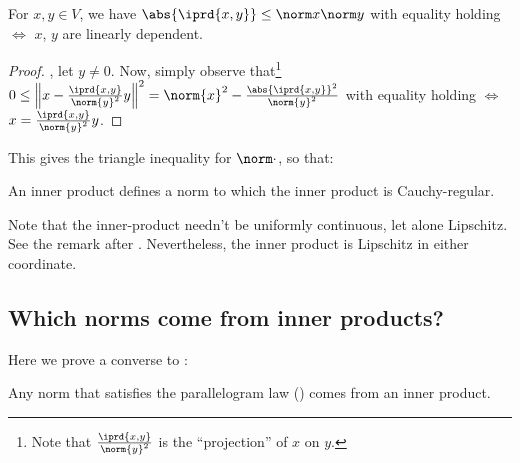 	\begin{prp}\label{PRP: cauchy-schwarz}
		For $x, y\in V$, we have $\abs{\iprd{x, y}}\le \norm x\norm y$ with equality holding $\iff$ $x$, $y$ are linearly dependent.
	\end{prp}
	
	\begin{proof}
		\Wlogg, let $y\ne 0$. Now, simply observe that\footnote{Note that $\frac{\iprd{x, y}}{\norm{y}^2}$ is the ``projection'' of $x$ on $y$.} $0 \le \Bigl\Vert x - \frac{\iprd{x, y}}{\norm{y}^2} y\Bigr\Vert^2 = \norm{x}^2 - \frac{\abs{\iprd{x, y}}^2}{\norm{y}^2}$ with equality holding $\iff$ $x = \frac{\iprd{x, y}}{\norm{y}^2}y$.
	\end{proof}
	
	This gives the triangle inequality for $\norm\cdot$, so that:
	
	\begin{cor}\label{COR: norm due to inner prod}
		An inner product defines a norm \wrt to which the inner product is Cauchy-regular.
	\end{cor}
	
	\begin{rmk}
		Note that the inner-product needn't be uniformly continuous, let alone Lipschitz. See the remark after . Nevertheless, the inner product is Lipschitz in either coordinate.
	\end{rmk}
	
	
	
\subsection{Which norms come from inner products?}
	
	Here we prove a converse to :
	
	\begin{prp}
		Any norm that satisfies the parallelogram law () comes from an inner product.
	\end{prp}
	
